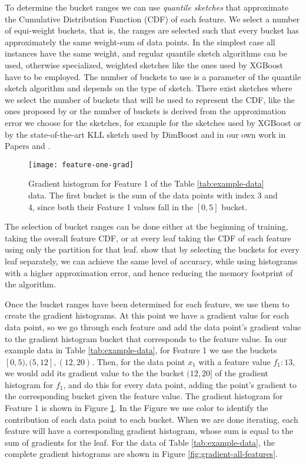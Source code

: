 To determine the bucket ranges we
can use \emph{quantile sketches} \cite{greenwald2016quantiles} that approximate
the Cumulative Distribution Function (CDF) of each feature. We select a number of
equi-weight buckets, that is, the ranges are selected such that every bucket
has approximately the same weight-sum of data points. In the simplest case
all instances have the same weight, and regular quantile sketch algorithms
can be used, otherwise specialized, weighted sketches like the ones used by XGBoost
have to be employed.
The number of buckets to use is a
parameter of the quantile sketch algorithm and depends on the type of sketch.
There exist sketches where we select the number of buckets that
will be used to represent the CDF, like the ones proposed by \citet{BenHaim2010parallel}
or the number of buckets is derived from the approximation error we choose for the sketches, for example
for the sketches used by XGBoost or by the state-of-the-art KLL sketch \cite{karnin2016kll}
used by DimBoost \cite{dimboost} and in our own work in Papers \uncertaintreesNum and \blockgbtNum.

\begin{figure}
	\centering
	\texttt{[image: feature-one-grad]}
	\caption{Gradient histogram for Feature 1 of the Table \ref{tab:example-data} data.
	The first bucket is the sum of the data points with index 3 and 4, since both their Feature 1
	values fall in the $[0, 5]$ bucket.}
	\label{fig:gradient-feature-one}
\end{figure}


The selection of bucket ranges can be done either at the beginning of training, taking the
overall feature CDF, or at every leaf taking the CDF of each feature using only the
partition for that leaf. \citet{xgboost} show that by selecting the buckets for every
leaf separately, we can achieve the same level of accuracy, while using histograms with a higher approximation error, and hence reducing the memory footprint of the algorithm.


Once the bucket ranges have been determined for each feature, we use them to create
the gradient histograms. At this point we have a gradient value for each data point, so
we go through each feature and add the data point's gradient value to the gradient
histogram bucket
that corresponds to the feature value.
In our example data in Table \ref{tab:example-data}, for Feature 1 we use the
buckets $[0, 5), (5, 12], (12, 20)$.
Then, for the data point $x_1$ with a feature value $f_1 : 13$, we would add its
gradient value to the
the bucket $(12, 20]$ of the gradient histogram for $f_1$, and do this for
every data point, adding the point's gradient to the corresponding bucket given
the feature value. The gradient histogram for Feature 1 is shown in Figure \ref{fig:gradient-feature-one}. In the Figure we use color to identify the
contribution of each data point to each bucket.
When we are done iterating, each feature will have a corresponding gradient histogram,
whose sum is equal to the sum of gradients for the leaf.
For the data of Table \ref{tab:example-data}, the complete gradient histograms
are shown in Figure \ref{fig:gradient-all-features}.


